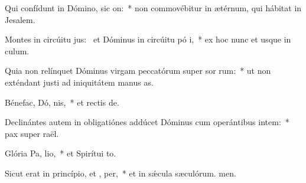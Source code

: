 \item Qui confídunt in Dómino, sic  on:~* non commovébitur in ætérnum, qui hábitat in Jesalem.
\item Montes in circúitu jus:~\pscross{} et Dóminus in circúitu pó i,~* ex hoc nunc et usque in culum.
\item Quia non relínquet Dóminus virgam peccatórum super sor rum:~* ut non exténdant justi ad iniquitátem manus as.
\item Bénefac, Dó, nis,~* et rectis de.
\item Declinántes autem in obligatiónes addúcet Dóminus cum operántibus intem:~* pax super raël.
\item Glória Pa,  lio,~* et Spirítui to.
\item Sicut erat in princípio, et ,  per,~* et in sǽcula sæculórum. men.
